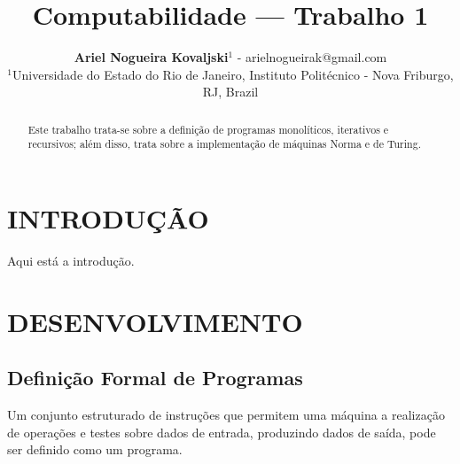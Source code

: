 \documentclass[12pt,fleqn]{article}
\title{Computabilidade --- Trabalho 1}
\author
    {\rm \begin{tabular}{l}
    \textbf{Ariel Nogueira Kovaljski}$^{1}$ - {\textnormal
    arielnogueirak@gmail.com}\\%
    {\fontsize{11}{0}\selectfont $^{1}$Universidade do Estado do Rio de
    Janeiro, Instituto Politécnico - Nova Friburgo, RJ,
    Brazil}\vspace*{-0.05cm} \\
  \end{tabular}}
\renewcommand{\headrulewidth}{0.0pt}
\begin{document}
%

\vspace{-3cm}

\maketitle


\pagestyle{empty}

\thispagestyle{firspagetstyle}

\begin{abstract}
Este trabalho trata-se sobre a definição de programas monolíticos, iterativos e
recursivos; além disso, trata sobre a implementação de máquinas Norma e de
Turing.
\end{abstract}



\fancyhead[L]{\footnotesize{\fontsize{7.5}{0}\selectfont \it}}

\renewcommand{\headrulewidth}{0.0pt}
\fancyfoot[C]{\footnotesize \parbox{15cm} {\centering
\fontsize{7.5}{0}\selectfont \it  }} %
\rhead{}


\pagestyle{fancy}


\section{INTRODUÇÃO}
Aqui está a introdução.

\section{DESENVOLVIMENTO}

\subsection{Definição Formal de Programas}
Um conjunto estruturado de instruções que permitem uma máquina a realização
de operações e testes sobre dados de entrada, produzindo dados de saída, pode
ser definido como um programa.
\end{document}
